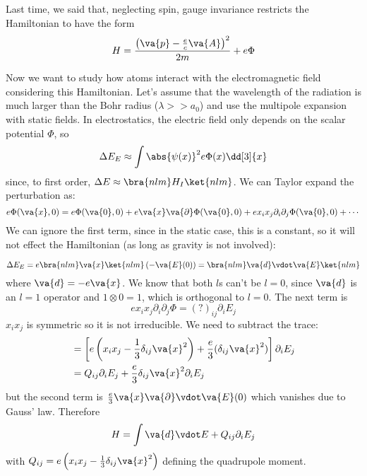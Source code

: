 \documentclass[a4paper,twoside,master.tex]{subfiles}
\begin{document}

Last time, we said that, neglecting spin, gauge invariance restricts the Hamiltonian to have the form
\begin{equation}
    H = \frac{\left( \va{p} - \frac{e}{c} \va{A} \right)^2}{2m} + e \Phi
\end{equation}

Now we want to study how atoms interact with the electromagnetic field considering this Hamiltonian. Let's assume that the wavelength of the radiation is much larger than the Bohr radius ($ \lambda >> a_0 $) and use the multipole expansion with static fields. In electrostatics, the electric field only depends on the scalar potential $ \Phi $, so
\begin{equation}
    \Delta E_{E} \approx \int \abs{\psi(x)}^2 e \Phi(x) \dd[3]{x}
\end{equation}
since, to first order, $ \Delta E \approx\bra{nlm} H_I\ket{nlm} $. We can Taylor expand the perturbation as:
\begin{equation}
    e \Phi(\va{x}, 0) = e \Phi(\va{0}, 0) + e \va{x} \va{\partial} \Phi(\va{0}, 0) + e x_i x_j \partial_i \partial_j \Phi(\va{0}, 0) + \cdots
\end{equation}
We can ignore the first term, since in the static case, this is a constant, so it will not effect the Hamiltonian (as long as gravity is not involved):

\begin{equation}
    \Delta E_E = e\bra{nlm} \va{x}\ket{nlm} \left( - \va{E}(0) \right) =\bra{nlm} \va{d} \vdot \va{E}\ket{nlm}
\end{equation}
where $ \va{d} = - e \va{x} $. We know that both $ l $s can't be $ l=0 $, since $ \va{d} $ is an $ l=1 $ operator and $ 1 \otimes 0 = 1 $, which is orthogonal to $ l=0 $. The next term is
\begin{equation}
    e x_i x_j \partial_i \partial_j \Phi = (?)_{ij} \partial_i E_j
\end{equation}
$ x_i x_j $ is symmetric so it is not irreducible. We need to subtract the trace:
\begin{align}
    &= \left[ e \left( x_i x_j - \frac{1}{3} \delta_{ij} \va{x}^2 \right) + \frac{e}{3} (\delta_{ij} \va{x}^2) \right] \partial_i E_j \\
    &= Q_{ij} \partial_i E_j + \frac{e}{3} \delta_{ij} \va{x}^2 \partial_i E_j
\end{align}
but the second term is $ \frac{e}{3} \va{x} \va{\partial} \vdot \va{E}(0) $ which vanishes due to Gauss' law. Therefore
\begin{equation}
    H = \int \va{d} \vdot E + Q_{ij} \partial_i E_j
\end{equation}
with $ Q_{ij} = e\left( x_i x_j - \frac{1}{3} \delta_{ij} \va{x}^2 \right) $ defining the quadrupole moment.
\end{document}
